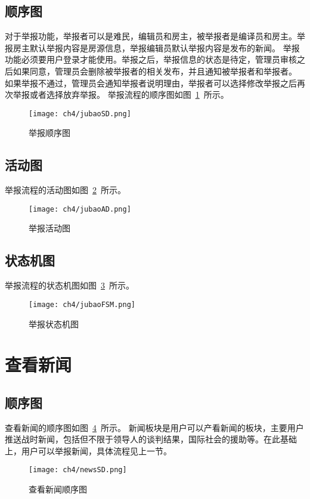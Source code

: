 \subsection{顺序图}
对于举报功能，举报者可以是难民，编辑员和房主，被举报者是编译员和房主。举报房主默认举报内容是房源信息，举报编辑员默认举报内容是发布的新闻。
举报功能必须要用户登录才能使用。举报之后，举报信息的状态是待定，管理员审核之后如果同意，管理员会删除被举报者的相关发布，并且通知被举报者和举报者。
如果举报不通过，管理员会通知举报者说明理由，举报者可以选择修改举报之后再次举报或者选择放弃举报。
举报流程的顺序图如图~\ref{fig:jubaoSD}~所示。
\begin{figure}[htbp]
    \centering
    \texttt{[image: ch4/jubaoSD.png]}
    \caption{举报顺序图}\label{fig:jubaoSD}
    \vspace{\baselineskip} %
\end{figure}
\subsection{活动图}
举报流程的活动图如图~\ref{fig:jubaoAD}~所示。
\begin{figure}[htbp]
    \centering
    \texttt{[image: ch4/jubaoAD.png]}
    \caption{举报活动图}\label{fig:jubaoAD}
    \vspace{\baselineskip} %
\end{figure}
\subsection{状态机图}
举报流程的状态机图如图~\ref{fig:jubaoFSM}~所示。
\begin{figure}[htbp]
    \centering
    \texttt{[image: ch4/jubaoFSM.png]}
    \caption{举报状态机图}\label{fig:jubaoFSM}
    \vspace{\baselineskip} %
\end{figure}

\section{查看新闻}
\subsection{顺序图}
查看新闻的顺序图如图~\ref{fig:newsSD}~所示。
新闻板块是用户可以产看新闻的板块，主要用户推送战时新闻，包括但不限于领导人的谈判结果，国际社会的援助等。在此基础上，用户可以举报新闻，具体流程见上一节。
\begin{figure}[htbp]
    \centering
    \texttt{[image: ch4/newsSD.png]}
    \caption{查看新闻顺序图}\label{fig:newsSD}
    \vspace{\baselineskip} %
\end{figure}
